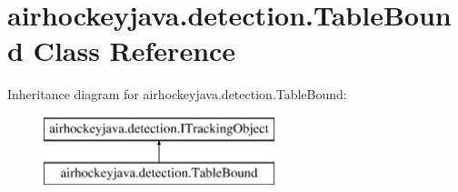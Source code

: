 \hypertarget{classairhockeyjava_1_1detection_1_1_table_bound}{}\section{airhockeyjava.\+detection.\+Table\+Bound Class Reference}
\label{classairhockeyjava_1_1detection_1_1_table_bound}
Inheritance diagram for airhockeyjava.\+detection.\+Table\+Bound\+:\begin{figure}[H]
\begin{center}
\leavevmode
\includegraphics[height=2.000000cm]{classairhockeyjava_1_1detection_1_1_table_bound}
\end{center}
\end{figure}
